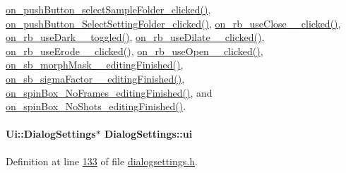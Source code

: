 \hyperlink{dialogsettings_8cpp_source_l00465}{on\+\_\+push\+Button\+\_\+select\+Sample\+Folder\+\_\+clicked()}, \hyperlink{dialogsettings_8cpp_source_l00476}{on\+\_\+push\+Button\+\_\+\+Select\+Setting\+Folder\+\_\+clicked()}, \hyperlink{dialogsettings_8cpp_source_l00405}{on\+\_\+rb\+\_\+use\+Close\+\_\+\_\+clicked()}, \hyperlink{dialogsettings_8cpp_source_l00381}{on\+\_\+rb\+\_\+use\+Dark\+\_\+\_\+toggled()}, \hyperlink{dialogsettings_8cpp_source_l00413}{on\+\_\+rb\+\_\+use\+Dilate\+\_\+\_\+clicked()}, \hyperlink{dialogsettings_8cpp_source_l00409}{on\+\_\+rb\+\_\+use\+Erode\+\_\+\_\+clicked()}, \hyperlink{dialogsettings_8cpp_source_l00401}{on\+\_\+rb\+\_\+use\+Open\+\_\+\_\+clicked()}, \hyperlink{dialogsettings_8cpp_source_l00417}{on\+\_\+sb\+\_\+morph\+Mask\+\_\+\_\+editing\+Finished()}, \hyperlink{dialogsettings_8cpp_source_l00397}{on\+\_\+sb\+\_\+sigma\+Factor\+\_\+\_\+editing\+Finished()}, \hyperlink{dialogsettings_8cpp_source_l00286}{on\+\_\+spin\+Box\+\_\+\+No\+Frames\+\_\+editing\+Finished()}, and \hyperlink{dialogsettings_8cpp_source_l00511}{on\+\_\+spin\+Box\+\_\+\+No\+Shots\+\_\+editing\+Finished()}.

\hypertarget{class_dialog_settings_a5b53d91a27cdf68f77e4bdd10b6a9bba}{}
\paragraph[{ui}]{\setlength{\rightskip}{0pt plus 5cm}Ui\+::\+Dialog\+Settings$\ast$ Dialog\+Settings\+::ui\hspace{0.3cm}{\ttfamily [private]}}\label{class_dialog_settings_a5b53d91a27cdf68f77e4bdd10b6a9bba}


Definition at line \hyperlink{dialogsettings_8h_source_l00133}{133} of file \hyperlink{dialogsettings_8h_source}{dialogsettings.\+h}.



